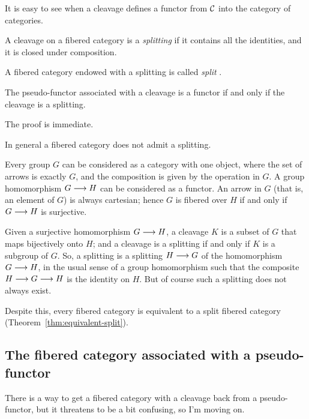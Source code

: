 \begin{3   FIBERED CATEGORIES}
\begin{3.1 Fibered categories}


It is easy to see when a cleavage defines a functor from $\mathcal{C}$ into the category of categories.

\begin{definition}
A cleavage on a fibered category is a \emph{splitting}%
 if it contains all the identities, and it is closed under composition.

A fibered category endowed with a splitting is called \emph{split}%
%
.
\end{definition}

\begin{proposition}
The pseudo-functor associated with a cleavage is a functor if and only if the cleavage is a splitting.
\end{proposition}

The proof is immediate.

In general a fibered category does not admit a splitting.

\begin{example}\label{ex:fibered-nosplitting}
Every group $G$ can be considered as a category with one object, where the set of arrows is exactly $G$, and the composition is given by the operation in $G$. A group homomorphism $G \arr H$ can be considered as a functor. An arrow in $G$ (that is, an element of $G$) is always cartesian; hence $G$ is fibered over $H$ if and only if $G \arr H$ is surjective.

Given a surjective homomorphism $G \arr H$, a cleavage $K$ is a subset of $G$ that maps bijectively onto $H$; and a cleavage is a splitting if and only if $K$ is a subgroup of $G$. So, a splitting is a splitting $H \arr  G$ of the homomorphism $G \arr H$, in the usual sense of a group homomorphism such that the composite $H \arr G \arr H$ is the identity on $H$. But of course such a splitting does not always exist.
\end{example}

Despite this, every fibered category is equivalent to a split fibered category (Theorem~\ref{thm:equivalent-split}).



\subsection{The fibered category associated with a pseudo-functor} \label{subsec:presheaf-cat}
\hfil
\begin{shaded}
There is a way to get a fibered category with a cleavage back from a pseudo-functor, but it threatens to be a bit confusing, so I'm moving on.
\end{shaded}


\end{3.1 Fibered categories}
\end{3   FIBERED CATEGORIES}
